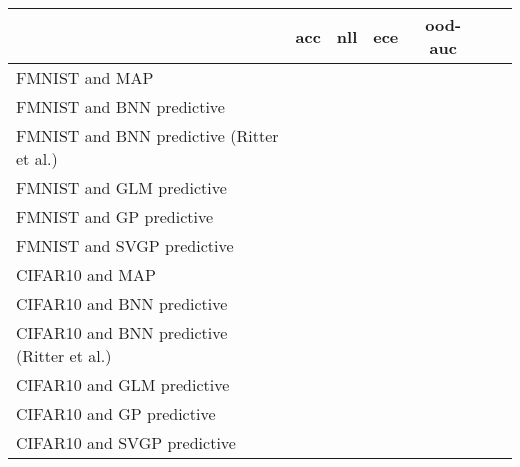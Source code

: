 \begin{tabular}{l C{0.6\tblw} C{0.6\tblw} C{0.6\tblw} C{0.6\tblw} C{0.6\tblw}  C{0.6\tblw}}
\toprule
& acc & nll & ece & ood-auc  \\
\midrule
\sc FMNIST and MAP &  &  &  &  \\
\sc FMNIST and BNN predictive &  &  &  &  \\
\sc FMNIST and BNN predictive (Ritter et al.) &  &  &  &  \\
\sc FMNIST and GLM predictive &  &  &  &  \\
\sc FMNIST and GP predictive &  &  &  &  \\
\sc FMNIST and SVGP predictive &  &  &  &  \\
\sc CIFAR10 and MAP &  &  &  &  \\
\sc CIFAR10 and BNN predictive &  &  &  &  \\
\sc CIFAR10 and BNN predictive (Ritter et al.) &  &  &  &  \\
\sc CIFAR10 and GLM predictive &  &  &  &  \\
\sc CIFAR10 and GP predictive &  &  &  &  \\
\sc CIFAR10 and SVGP predictive &  &  &  &  \\
\bottomrule
\end{tabular}

